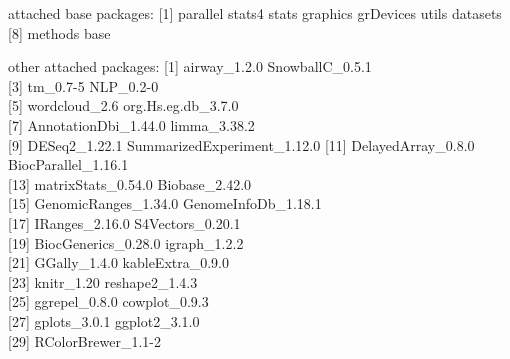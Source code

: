 \documentclass[9pt,a4paper,]{extarticle}
\theoremstyle{definition}
\theoremstyle{definition}
\theoremstyle{definition}
\theoremstyle{remark}
\begin{document}
attached base packages:
{[}1{]} parallel stats4 stats graphics grDevices utils datasets
{[}8{]} methods base

other attached packages:
{[}1{]} airway\_1.2.0 SnowballC\_0.5.1\\
{[}3{]} tm\_0.7-5 NLP\_0.2-0\\
{[}5{]} wordcloud\_2.6 org.Hs.eg.db\_3.7.0\\
{[}7{]} AnnotationDbi\_1.44.0 limma\_3.38.2\\
{[}9{]} DESeq2\_1.22.1 SummarizedExperiment\_1.12.0
{[}11{]} DelayedArray\_0.8.0 BiocParallel\_1.16.1\\
{[}13{]} matrixStats\_0.54.0 Biobase\_2.42.0\\
{[}15{]} GenomicRanges\_1.34.0 GenomeInfoDb\_1.18.1\\
{[}17{]} IRanges\_2.16.0 S4Vectors\_0.20.1\\
{[}19{]} BiocGenerics\_0.28.0 igraph\_1.2.2\\
{[}21{]} GGally\_1.4.0 kableExtra\_0.9.0\\
{[}23{]} knitr\_1.20 reshape2\_1.4.3\\
{[}25{]} ggrepel\_0.8.0 cowplot\_0.9.3\\
{[}27{]} gplots\_3.0.1 ggplot2\_3.1.0\\
{[}29{]} RColorBrewer\_1.1-2
\end{document}
